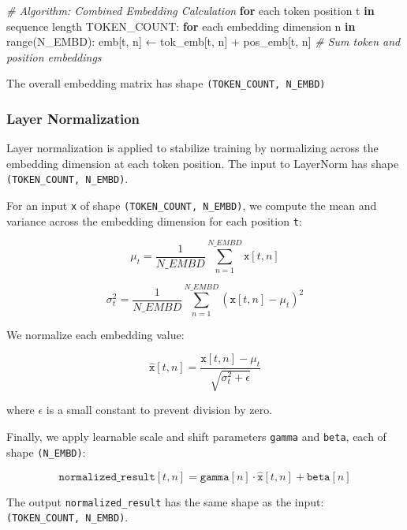 \documentclass[11pt]{article}
\newenvironment{Shaded}{}{}
\newcommand{\KeywordTok}[1]{\textcolor[rgb]{0.00,0.44,0.13}{\textbf{{#1}}}}
\newcommand{\CommentTok}[1]{\textcolor[rgb]{0.38,0.63,0.69}{\textit{{#1}}}}
\newcommand{\NormalTok}[1]{{#1}}
\newcommand{\ControlFlowTok}[1]{\textcolor[rgb]{0.00,0.44,0.13}{\textbf{{#1}}}}
\newcommand{\OperatorTok}[1]{\textcolor[rgb]{0.40,0.40,0.40}{{#1}}}
\newcommand{\BuiltInTok}[1]{{#1}}
\begin{document}
\begin{Shaded}
\begin{Highlighting}[]
\CommentTok{\# Algorithm: Combined Embedding Calculation}
\ControlFlowTok{for}\NormalTok{ each token position t }\KeywordTok{in}\NormalTok{ sequence length TOKEN\_COUNT:}
    \ControlFlowTok{for}\NormalTok{ each embedding dimension n }\KeywordTok{in} \BuiltInTok{range}\NormalTok{(N\_EMBD):}
\NormalTok{        emb[t, n] ← tok\_emb[t, n] }\OperatorTok{+}\NormalTok{ pos\_emb[t, n]  }\CommentTok{\# Sum token and position embeddings}
\end{Highlighting}
\end{Shaded}

The overall embedding matrix has shape \texttt{(TOKEN\_COUNT,\ N\_EMBD)}

    \subsubsection{Layer Normalization}\label{layer-normalization}

Layer normalization is applied to stabilize training by normalizing
across the embedding dimension at each token position. The input to
LayerNorm has shape \texttt{(TOKEN\_COUNT,\ N\_EMBD)}.

For an input \texttt{x} of shape \texttt{(TOKEN\_COUNT,\ N\_EMBD)}, we
compute the mean and variance across the embedding dimension for each
position \texttt{t}:

\[
\mu_t = \frac{1}{N\_EMBD} \sum_{n=1}^{N\_EMBD} \texttt{x}[t, n]
\]

\[
\sigma^2_t = \frac{1}{N\_EMBD} \sum_{n=1}^{N\_EMBD} (\texttt{x}[t, n] - \mu_t)^2
\]

We normalize each embedding value:

\[
\hat{\texttt{x}}[t, n] = \frac{\texttt{x}[t, n] - \mu_t}{\sqrt{\sigma^2_t + \epsilon}}
\]

where \(\epsilon\) is a small constant to prevent division by zero.

Finally, we apply learnable scale and shift parameters \texttt{gamma}
and \texttt{beta}, each of shape \texttt{(N\_EMBD)}:

\[
\texttt{normalized\_result}[t, n] = \texttt{gamma}[n] \cdot \hat{\texttt{x}}[t, n] + \texttt{beta}[n]
\]

The output \texttt{normalized\_result} has the same shape as the input:
\texttt{(TOKEN\_COUNT,\ N\_EMBD)}.
\end{document}
